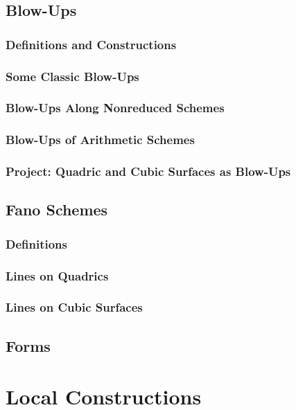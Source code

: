 \documentclass[oneside]{amsbook}
\numberwithin{ex}{chapter}
\begin{document}
\section{Blow-Ups}
\subsection{Definitions and Constructions}

\subsection{Some Classic Blow-Ups}

\subsection{Blow-Ups Along Nonreduced Schemes}

\subsection{Blow-Ups of Arithmetic Schemes}

\subsection{Project: Quadric and Cubic Surfaces as Blow-Ups}


\section{Fano Schemes}
\subsection{Definitions}

\subsection{Lines on Quadrics}

\subsection{Lines on Cubic Surfaces}


\section{Forms}


\chapter{Local Constructions}
\end{document}
